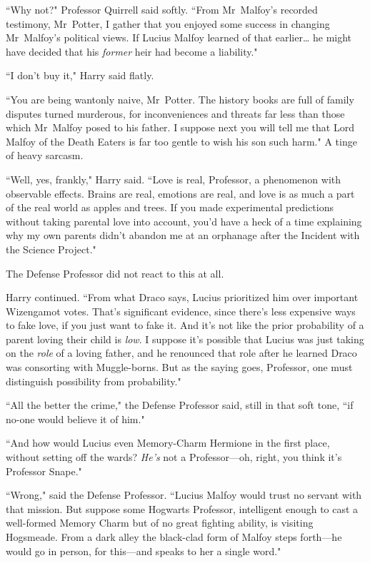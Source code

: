 ``Why not?" Professor Quirrell said softly. ``From Mr~Malfoy's recorded testimony, Mr~Potter, I gather that you enjoyed some success in changing Mr~Malfoy's political views. If Lucius Malfoy learned of that earlier{\ldots} he might have decided that his \emph{former} heir had become a liability."

``I don't buy it," Harry said flatly.

``You are being wantonly naive, Mr~Potter. The history books are full of family disputes turned murderous, for inconveniences and threats far less than those which Mr~Malfoy posed to his father. I suppose next you will tell me that Lord Malfoy of the Death Eaters is far too gentle to wish his son such harm." A tinge of heavy sarcasm.

``Well, yes, frankly," Harry said. ``Love is real, Professor, a phenomenon with observable effects. Brains are real, emotions are real, and love is as much a part of the real world as apples and trees. If you made experimental predictions without taking parental love into account, you'd have a heck of a time explaining why my own parents didn't abandon me at an orphanage after the Incident with the Science Project."

The Defense Professor did not react to this at all.

Harry continued. ``From what Draco says, Lucius prioritized him over important Wizengamot votes. That's significant evidence, since there's less expensive ways to fake love, if you just want to fake it. And it's not like the prior probability of a parent loving their child is \emph{low}. I suppose it's possible that Lucius was just taking on the \emph{role} of a loving father, and he renounced that role after he learned Draco was consorting with Muggle-borns. But as the saying goes, Professor, one must distinguish possibility from probability."

``All the better the crime," the Defense Professor said, still in that soft tone, ``if no-one would believe it of him."

``And how would Lucius even Memory-Charm Hermione in the first place, without setting off the wards? \emph{He's} not a Professor—oh, right, you think it's Professor Snape."

``Wrong," said the Defense Professor. ``Lucius Malfoy would trust no servant with that mission. But suppose some Hogwarts Professor, intelligent enough to cast a well-formed Memory Charm but of no great fighting ability, is visiting Hogsmeade. From a dark alley the black-clad form of Malfoy steps forth—he would go in person, for this—and speaks to her a single word."

